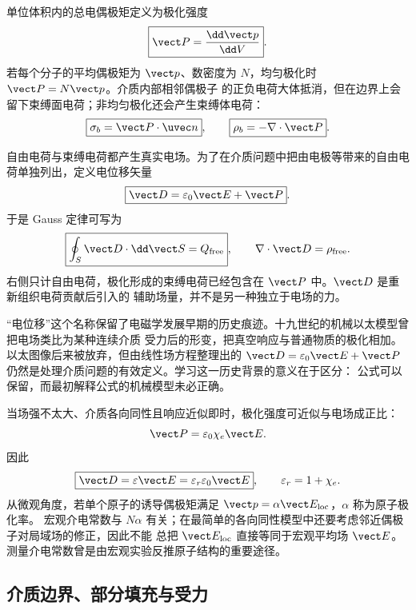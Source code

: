 单位体积内的总电偶极矩定义为极化强度
\begin{equation}
  \boxed{\vect P=\frac{\dd\vect p}{\dd V}}.
\end{equation}
若每个分子的平均偶极矩为 $\vect p$、数密度为 $N$，均匀极化时 $\vect P=N\vect p$。介质内部相邻偶极子
的正负电荷大体抵消，但在边界上会留下束缚面电荷；非均匀极化还会产生束缚体电荷：
\begin{equation}
  \boxed{\sigma_b=\vect P\cdot\uvec n},
  \qquad
  \boxed{\rho_b=-\nabla\cdot\vect P}.
\end{equation}

\polarizationDiagram

自由电荷与束缚电荷都产生真实电场。为了在介质问题中把由电极等带来的自由电荷单独列出，定义电位移矢量
\begin{equation}
  \boxed{\vect D=\varepsilon_0\vect E+\vect P}.
\end{equation}
于是 Gauss 定律可写为
\begin{equation}
  \boxed{\oint_S\vect D\cdot\dd\vect S=Q_{\rm free}},
  \qquad
  \nabla\cdot\vect D=\rho_{\rm free}.
\end{equation}
右侧只计自由电荷，极化形成的束缚电荷已经包含在 $\vect P$ 中。$\vect D$ 是重新组织电荷贡献后引入的
辅助场量，并不是另一种独立于电场的力。

“电位移”这个名称保留了电磁学发展早期的历史痕迹。十九世纪的机械以太模型曾把电场类比为某种连续介质
受力后的形变，把真空响应与普通物质的极化相加。以太图像后来被放弃，但由线性场方程整理出的
$\vect D=\varepsilon_0\vect E+\vect P$ 仍然是处理介质问题的有效定义。学习这一历史背景的意义在于区分：
公式可以保留，而最初解释公式的机械模型未必正确。

当场强不太大、介质各向同性且响应近似即时，极化强度可近似与电场成正比：
\begin{equation}
  \vect P=\varepsilon_0\chi_e\vect E.
\end{equation}
因此
\begin{equation}
  \boxed{\vect D=\varepsilon\vect E
  =\varepsilon_r\varepsilon_0\vect E},
  \qquad \varepsilon_r=1+\chi_e.
\end{equation}
从微观角度，若单个原子的诱导偶极矩满足 $\vect p=\alpha\vect E_{\rm loc}$，$\alpha$ 称为原子极化率。
宏观介电常数与 $N\alpha$ 有关；在最简单的各向同性模型中还要考虑邻近偶极子对局域场的修正，因此不能
总把 $\vect E_{\rm loc}$ 直接等同于宏观平均场 $\vect E$。测量介电常数曾是由宏观实验反推原子结构的重要途径。

\subsection*{介质边界、部分填充与受力}

